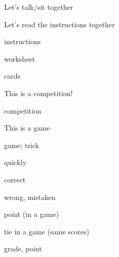 \cardfrontfoot{}
\begin{flashcard}{\LARGE Let's talk/sit together}
\LARGE {}
\end{flashcard}
\cardfrontfoot{}
\begin{flashcard}{\LARGE Let's read the instructions together}
\LARGE {}
\end{flashcard}
\cardfrontfoot{}
\begin{flashcard}{\LARGE instructions}
\LARGE {}
\end{flashcard}
\cardfrontfoot{}
\begin{flashcard}{\LARGE worksheet}
\LARGE {}
\end{flashcard}
\cardfrontfoot{}
\begin{flashcard}{\LARGE cards}
\LARGE {}
\end{flashcard}
\cardfrontfoot{}
\begin{flashcard}{\LARGE This is a competition!}
\LARGE {}
\end{flashcard}
\cardfrontfoot{}
\begin{flashcard}{\LARGE competition}
\LARGE {}
\end{flashcard}
\cardfrontfoot{}
\begin{flashcard}{\LARGE This is a game}
\LARGE {}
\end{flashcard}
\cardfrontfoot{}
\begin{flashcard}{\LARGE game; trick}
\LARGE {}
\end{flashcard}
\cardfrontfoot{}
\begin{flashcard}{\LARGE quickly}
\LARGE {}
\end{flashcard}
\cardfrontfoot{}
\begin{flashcard}{\LARGE correct}
\LARGE {}
\end{flashcard}
\cardfrontfoot{}
\begin{flashcard}{\LARGE wrong, mistaken}
\LARGE {}
\end{flashcard}
\cardfrontfoot{}
\begin{flashcard}{\LARGE point (in a game)}
\LARGE {}
\end{flashcard}
\cardfrontfoot{}
\begin{flashcard}{\LARGE tie in a game (same scores)}
\LARGE {}
\end{flashcard}
\cardfrontfoot{}
\begin{flashcard}{\LARGE grade, point}
\LARGE {}
\end{flashcard}
